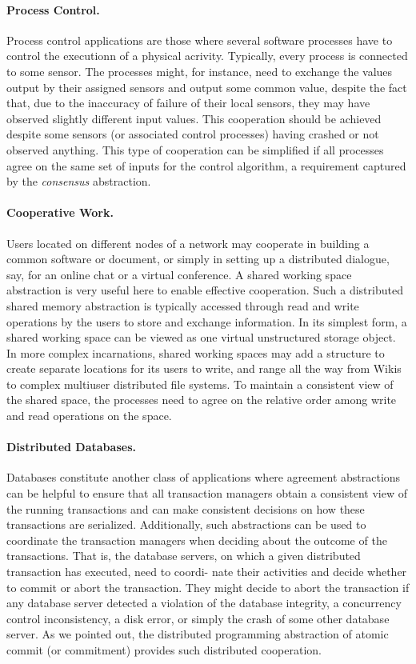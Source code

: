 \documentclass{book}
\begin{document}
\paragraph{Process Control.}
Process control applications are those where several software processes have to control the executionn of a physical acrivity.
\newline
Typically, every process is connected to some sensor.
The processes might, for instance, need to exchange the values output by their assigned sensors and output some common value, despite the fact that, due to the inaccuracy of failure of their local sensors, they may have observed slightly different input values.
This cooperation should be achieved despite some sensors (or associated control processes) having crashed or not observed anything.
This type of cooperation can be simplified if all processes agree on the same set of inputs for the control algorithm, a requirement captured by the \textit{consensus} abstraction.

\newpage
\paragraph{Cooperative Work.}
Users located on different nodes of a network may cooperate
in building a common software or document, or simply in setting up a distributed
dialogue, say, for an online chat or a virtual conference. A shared working space
abstraction is very useful here to enable effective cooperation. Such a distributed
shared memory abstraction is typically accessed through read and write operations
by the users to store and exchange information. In its simplest form, a shared working space can be viewed as one virtual unstructured storage object. 
In more complex incarnations, shared working spaces may add a structure to create separate locations for its users to write, and range all the way from Wikis to complex multiuser
distributed file systems. To maintain a consistent view of the shared space, the processes need to agree on the relative order among write and read operations on the
space.

\paragraph{Distributed Databases.}
Databases constitute another class of applications where
agreement abstractions can be helpful to ensure that all transaction managers obtain
a consistent view of the running transactions and can make consistent decisions on
how these transactions are serialized.
\newline
Additionally, such abstractions can be used to coordinate the transaction managers when deciding about the outcome of the transactions. That is, the database servers, on which a given distributed transaction has executed, need to coordi-
nate their activities and decide whether to commit or abort the transaction. They
might decide to abort the transaction if any database server detected a violation of
the database integrity, a concurrency control inconsistency, a disk error, or simply
the crash of some other database server. As we pointed out, the distributed programming abstraction of atomic commit (or commitment) provides such distributed
cooperation.
\end{document}
